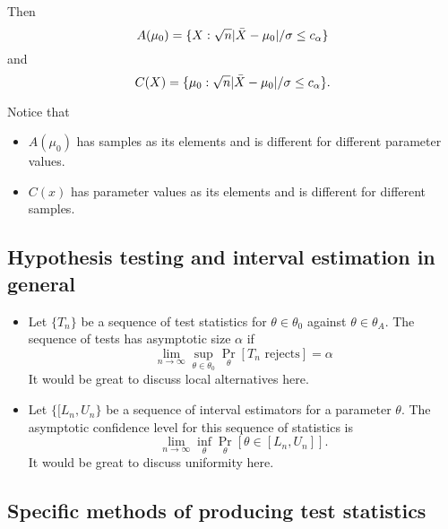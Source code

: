 \begin{itemize}[leftmargin=0pt]
\begin{ex}
    Then
    \begin{equation*}
      A(\mu_0) = \{X : \sqrt{n} |\bar{X} - \mu_0| / \sigma \leq c_\alpha\}
    \end{equation*}
    and
    \begin{equation*}
      C(X) = \{\mu_0 : \sqrt{n} |\bar{X} - \mu_0| / \sigma \leq c_\alpha\}.
    \end{equation*}
  \end{ex}

  Notice that
  \begin{itemize}
  \item $A(\mu_0)$ has samples as its elements and is different for
    different parameter values.
  \item $C(x)$ has parameter values as its elements and is different
    for different samples.
  \end{itemize}

\end{itemize}

\subsection{Hypothesis testing and interval estimation in general}

\begin{itemize}[leftmargin=0pt]

\item Let $\{T_n\}$ be a sequence of test statistics for $\theta \in \theta_0$
  against $\theta \in \theta_A$.  The sequence of tests has asymptotic size $\alpha$ if
  \begin{equation*}
    \lim_{n \to \infty} \sup_{\theta \in \theta_0} \Pr_\theta[T_n \text{ rejects}] = \alpha
  \end{equation*}
  It would be great to discuss local alternatives here.

\item Let $\{[L_n, U_n\}$ be a sequence of interval estimators for a
  parameter $\theta$.  The asymptotic confidence level for this sequence of
  statistics is
  \begin{equation*}
    \lim_{n \to \infty} \inf_\theta \Pr_{\theta}[\theta \in [L_n, U_n]].
  \end{equation*}
  It would be great to discuss uniformity here.

\end{itemize}

\subsection{Specific methods of producing test statistics}

